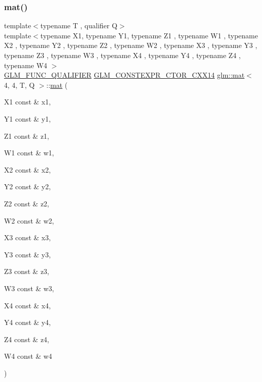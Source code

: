 \mbox{\label{structglm_1_1mat_3_014_00_014_00_01_t_00_01_q_01_4_ae64b907a3bd648bb5f89b20f1f06dd4c}} 
\subsubsection{\texorpdfstring{mat()}{mat()}\hspace{0.1cm}{\footnotesize\ttfamily [20/21]}}
{\footnotesize\ttfamily template$<$typename T , qualifier Q$>$ \\
template$<$typename X1, typename Y1, typename Z1 , typename W1 , typename X2 , typename Y2 , typename Z2 , typename W2 , typename X3 , typename Y3 , typename Z3 , typename W3 , typename X4 , typename Y4 , typename Z4 , typename W4 $>$ \\
\hyperlink{setup_8hpp_a33fdea6f91c5f834105f7415e2a64407}{G\+L\+M\+\_\+\+F\+U\+N\+C\+\_\+\+Q\+U\+A\+L\+I\+F\+I\+ER} \hyperlink{setup_8hpp_a0900f9145e68bf6061b6f5e7be3fa751}{G\+L\+M\+\_\+\+C\+O\+N\+S\+T\+E\+X\+P\+R\+\_\+\+C\+T\+O\+R\+\_\+\+C\+X\+X14} \hyperlink{structglm_1_1mat}{glm\+::mat}$<$ 4, 4, T, Q $>$\+::\hyperlink{structglm_1_1mat}{mat} (\begin{DoxyParamCaption}\item[{X1 const \&}]{x1,  }\item[{Y1 const \&}]{y1,  }\item[{Z1 const \&}]{z1,  }\item[{W1 const \&}]{w1,  }\item[{X2 const \&}]{x2,  }\item[{Y2 const \&}]{y2,  }\item[{Z2 const \&}]{z2,  }\item[{W2 const \&}]{w2,  }\item[{X3 const \&}]{x3,  }\item[{Y3 const \&}]{y3,  }\item[{Z3 const \&}]{z3,  }\item[{W3 const \&}]{w3,  }\item[{X4 const \&}]{x4,  }\item[{Y4 const \&}]{y4,  }\item[{Z4 const \&}]{z4,  }\item[{W4 const \&}]{w4 }\end{DoxyParamCaption})}

